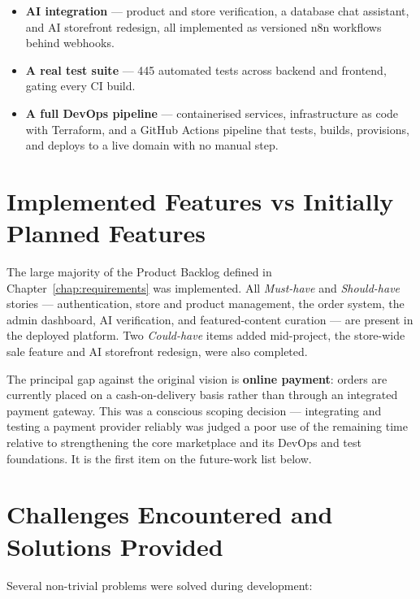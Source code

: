 \documentclass[12pt, a4paper, oneside]{report}
\begin{document}
\begin{itemize}[leftmargin=*,itemsep=2pt]
  \item \textbf{AI integration} --- product and store verification,
        a database chat assistant, and AI storefront redesign, all
        implemented as versioned n8n workflows behind webhooks.
  \item \textbf{A real test suite} --- 445 automated tests across
        backend and frontend, gating every CI build.
  \item \textbf{A full DevOps pipeline} --- containerised services,
        infrastructure as code with Terraform, and a GitHub Actions
        pipeline that tests, builds, provisions, and deploys to a live
        domain with no manual step.
\end{itemize}

\section*{Implemented Features vs Initially Planned Features}

The large majority of the Product Backlog defined in
Chapter~\ref{chap:requirements} was implemented. All \emph{Must-have}
and \emph{Should-have} stories --- authentication, store and product
management, the order system, the admin dashboard, AI verification,
and featured-content curation --- are present in the deployed
platform. Two \emph{Could-have} items added mid-project, the
store-wide sale feature and AI storefront redesign, were also
completed.

The principal gap against the original vision is \textbf{online
payment}: orders are currently placed on a cash-on-delivery basis
rather than through an integrated payment gateway. This was a
conscious scoping decision --- integrating and testing a payment
provider reliably was judged a poor use of the remaining time
relative to strengthening the core marketplace and its DevOps and
test foundations. It is the first item on the future-work list below.

\section*{Challenges Encountered and Solutions Provided}

Several non-trivial problems were solved during development:
\end{document}
